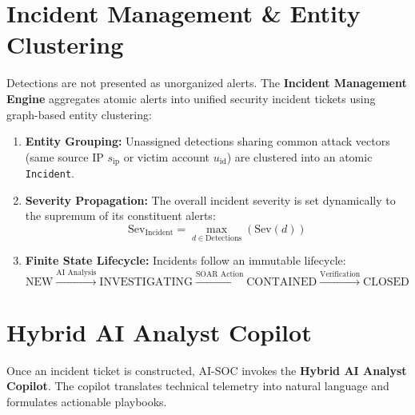 \documentclass[11pt,a4paper]{article}
\begin{document}
\section{Incident Management \& Entity Clustering}

Detections are not presented as unorganized alerts. The \textbf{Incident Management Engine} aggregates atomic alerts into unified security incident tickets using graph-based entity clustering:

\begin{enumerate}
    \item \textbf{Entity Grouping:} Unassigned detections sharing common attack vectors (same source IP $s_{\text{ip}}$ or victim account $u_{\text{id}}$) are clustered into an atomic \texttt{Incident}.
    \item \textbf{Severity Propagation:} The overall incident severity is set dynamically to the supremum of its constituent alerts:
    \begin{equation}
        \text{Sev}_{\text{Incident}} = \max_{d \in \text{Detections}} \left( \text{Sev}(d) \right)
    \end{equation}
    \item \textbf{Finite State Lifecycle:} Incidents follow an immutable lifecycle:
    \begin{equation}
        \text{NEW} \xrightarrow{\text{AI Analysis}} \text{INVESTIGATING} \xrightarrow{\text{SOAR Action}} \text{CONTAINED} \xrightarrow{\text{Verification}} \text{CLOSED}
    \end{equation}
\end{enumerate}

\section{Hybrid AI Analyst Copilot}

Once an incident ticket is constructed, AI-SOC invokes the \textbf{Hybrid AI Analyst Copilot}. The copilot translates technical telemetry into natural language and formulates actionable playbooks.
\end{document}
